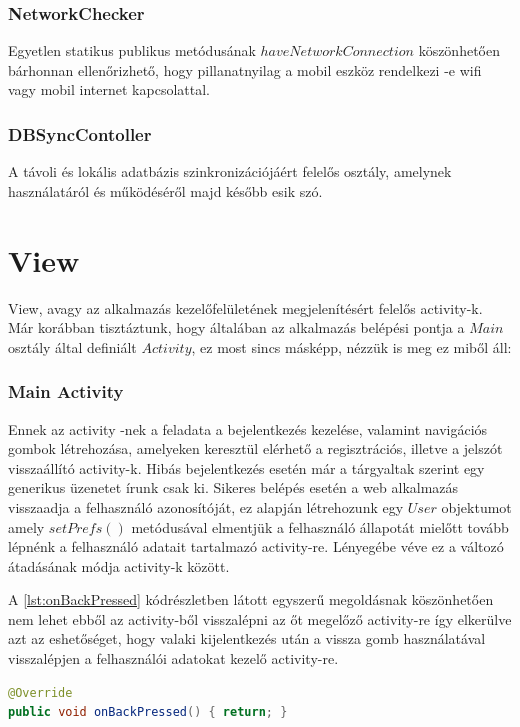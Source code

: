 \documentclass[12pt]{report}
\theoremstyle{definition}
\begin{document}
	\subsubsection{NetworkChecker}
	Egyetlen statikus publikus metódusának $haveNetworkConnection$ köszönhetően bárhonnan ellenőrizhető, hogy pillanatnyilag a mobil eszköz rendelkezi -e wifi vagy mobil internet kapcsolattal. 
	
	\subsubsection{DBSyncContoller}
	A távoli és lokális adatbázis szinkronizációjáért felelős osztály, amelynek használatáról és működéséről majd később esik szó.
	
	\section{View}
	View, avagy az alkalmazás kezelőfelületének megjelenítésért felelős activity-k. Már korábban tisztáztunk, hogy általában az alkalmazás belépési pontja a $Main$ osztály által definiált $Activity$, ez most sincs másképp, nézzük is meg ez miből áll:
	
	\subsubsection{Main Activity}
	Ennek az activity -nek a feladata a bejelentkezés kezelése, valamint navigációs gombok létrehozása, amelyeken keresztül elérhető a regisztrációs, illetve a jelszót visszaállító activity-k. Hibás bejelentkezés esetén már a tárgyaltak szerint egy generikus üzenetet írunk csak ki. Sikeres belépés esetén a web alkalmazás visszaadja a felhasználó azonosítóját, ez alapján létrehozunk egy $User$ objektumot amely $setPrefs\left(\right)$ metódusával elmentjük a felhasználó állapotát mielőtt tovább lépnénk a felhasználó adatait tartalmazó activity-re. Lényegébe véve ez a változó átadásának módja activity-k között.
	
	A \ref{lst:onBackPressed} kódrészletben látott egyszerű megoldásnak köszönhetően nem lehet ebből az activity-ből visszalépni az őt megelőző activity-re így elkerülve azt az eshetőséget, hogy valaki kijelentkezés után a vissza gomb használatával visszalépjen a felhasználói adatokat kezelő activity-re.
	
	\noindent\begin{minipage}{\linewidth}
		\begin{lstlisting}[language=java,label={lst:onBackPressed}, caption={Vissza gomb letiltása}]
		@Override
public void onBackPressed() { return; }
		\end{lstlisting}
	\end{minipage}
	
\end{document}
